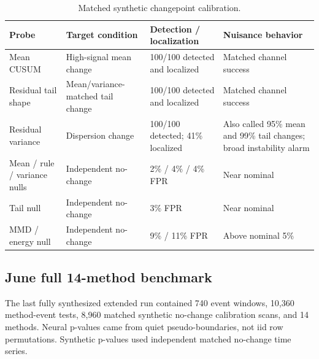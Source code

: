 \documentclass[10pt]{article}
\begin{document}
\begin{table}[H]
\centering\small
\begin{tabularx}{\linewidth}{Y L{2.3cm}L{2.1cm}Y}
\toprule Probe & Target condition & Detection / localization & Nuisance behavior \\
\midrule
Mean CUSUM & High-signal mean change & 100/100 detected and localized & Matched channel success \\
Residual tail shape & Mean/variance-matched tail change & 100/100 detected and localized & Matched channel success \\
Residual variance & Dispersion change & 100/100 detected; 41\% localized & Also called 95\% mean and 99\% tail changes; broad instability alarm \\
Mean / rule / variance nulls & Independent no-change & 2\% / 4\% / 4\% FPR & Near nominal \\
Tail null & Independent no-change & 3\% FPR & Near nominal \\
MMD / energy null & Independent no-change & 9\% / 11\% FPR & Above nominal 5\% \\
\bottomrule
\end{tabularx}
\caption{Matched synthetic changepoint calibration.}
\end{table}

\subsection{June full 14-method benchmark}

The last fully synthesized extended run contained 740 event windows, 10,360 method-event tests, 8,960 matched synthetic no-change calibration scans, and 14 methods. Neural p-values came from quiet pseudo-boundaries, not iid row permutations. Synthetic p-values used independent matched no-change time series.
\end{document}

